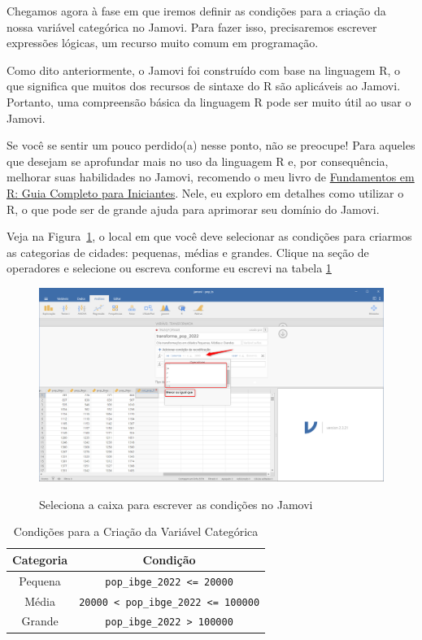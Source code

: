 Chegamos agora à fase em que iremos definir as condições para a criação da nossa variável categórica no Jamovi. Para fazer isso, precisaremos escrever expressões lógicas, um recurso muito comum em programação. 

Como dito anteriormente, o Jamovi foi construído com base na linguagem R, o que significa que muitos dos recursos de sintaxe do R são aplicáveis ao Jamovi. Portanto, uma compreensão básica da linguagem R pode ser muito útil ao usar o Jamovi.

Se você se sentir um pouco perdido(a) nesse ponto, não se preocupe! Para aqueles que desejam se aprofundar mais no uso da linguagem R e, por consequência, melhorar suas habilidades no Jamovi, recomendo o meu livro de \href{https://www.amazon.com.br/Fundamentos-Completo-Iniciantes-programa%C3%A7%C3%A3o-computa%C3%A7%C3%A3o-ebook/dp/B0B36NG18N}{Fundamentos em R: Guia Completo para Iniciantes}. Nele, eu exploro em detalhes como utilizar o R, o que pode ser de grande ajuda para aprimorar seu domínio do Jamovi.

Veja na Figura~\ref{fig:criar_categoria_jamovi_5}, o local em que você deve selecionar as condições para criarmos as categorias de cidades: pequenas, médias e grandes. Clique na seção de operadores e selecione ou escreva conforme eu escrevi na tabela \ref{tab:condicoes_pop_jamovi}

\begin{figure}[H]
    \centering
    \caption{Seleciona a caixa para escrever as condições no Jamovi}
    \includegraphics[width=\textwidth]{imagens/cap_2/criar_categoria_jamovi_5.png}
    \label{fig:criar_categoria_jamovi_5}
\end{figure}


\begin{table}[H]
    \centering
    \caption{Condições para a Criação da Variável Categórica}
    \label{tab:condicoes_pop_jamovi}
    \begin{tabular}{|c|c|}
    \hline
    \textbf{Categoria} & \textbf{Condição} \\
    \hline
    Pequena & \texttt{pop\_ibge\_2022 <= 20000} \\
    \hline
    Média & \texttt{20000 < pop\_ibge\_2022 <= 100000} \\
    \hline
    Grande & \texttt{pop\_ibge\_2022 > 100000} \\
    \hline
    \end{tabular}
\end{table}
    


